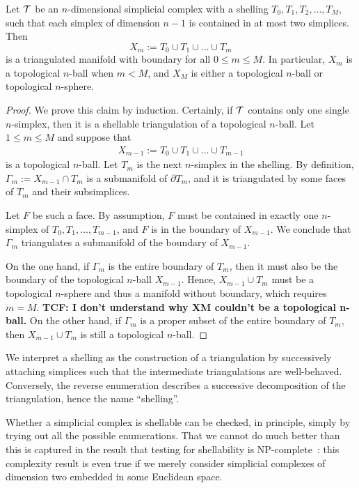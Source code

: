 \documentclass[10pt,a4paper]{article}
\newcommand{\todo}[1]{{\color{RedOrange}\textbf{#1}}}
\begin{document}
\begin{lemma}\label{lemma:shell_triang_man}
    Let ${\mathcal T}$ be an $n$-dimensional simplicial complex 
    with a shelling $T_{0}, T_{1}, T_{2}, \dots, T_{M}$,
    such that each simplex of dimension $n-1$ is contained in at most two simplices. 
    Then
    $$
        X_{m} := T_{0} \cup T_{1} \cup \dots \cup T_{m}
    $$ 
    is a triangulated manifold with boundary for all $0 \leq m \leq M$.
    In particular, $X_{m}$ is a topological $n$-ball when $m < M$, 
    and 
    $X_{M}$ is either a topological $n$-ball or topological $n$-sphere. 
\end{lemma}
\begin{proof}  
    We prove this claim by induction. 
    Certainly, if ${\mathcal T}$ contains only one single $n$-simplex, then it is a shellable triangulation of a topological $n$-ball. Let $1 \leq m \leq M$ and suppose that 
    \begin{align*}
        X_{m-1} := T_{0} \cup T_{1} \cup \dots \cup T_{m-1}
    \end{align*}
    is a topological $n$-ball. Let $T_{m}$ is the next $n$-simplex in the shelling.
    By definition, $\Gamma_{m} := X_{m-1} \cap T_{m}$ is a submanifold of $\partial T_{m}$,
    and it is triangulated by some faces of $T_{m}$ and their subsimplices. 
    
    Let $F$ be such a face. 
    By assumption, $F$ must be contained in exactly one $n$-simplex of $T_{0}, T_{1}, \dots, T_{m-1}$,
    and $F$ is in the boundary of $X_{m-1}$. 
    We conclude that $\Gamma_{m}$ triangulates a submanifold of the boundary of $X_{m-1}$.
    
    On the one hand, 
    if $\Gamma_{m}$ is the entire boundary of $T_{m}$, 
    then it must also be the boundary of the topological $n$-ball $X_{m-1}$. 
    Hence, $X_{m-1} \cup T_{m}$ must be a topological $n$-sphere and thus a manifold without boundary, 
    which requires $m = M$.
    \todo{TCF: I don’t understand why XM couldn’t be a topological n-ball.}
    On the other hand, 
    if $\Gamma_{m}$ is a proper subset of the entire boundary of $T_{m}$, 
    then $X_{m-1} \cup T_{m}$ is still a topological $n$-ball.
\end{proof}


\begin{remark}
    We interpret a shelling as the construction of a triangulation 
    by successively attaching simplices such that the intermediate triangulations are well-behaved. 
    Conversely, the reverse enumeration describes a successive decomposition of the triangulation, hence the name ``shelling''.
\end{remark}
\begin{remark}
    Whether a simplicial complex is shellable can be checked, in principle, simply by trying out all the possible enumerations.
    That we cannot do much better than this is captured in the result that testing for shellability is NP-complete~\cite{goaoc2019shellability}:
    this complexity result is even true if we merely consider simplicial complexes of dimension two embedded in some Euclidean space.
\end{remark}
\end{document}
